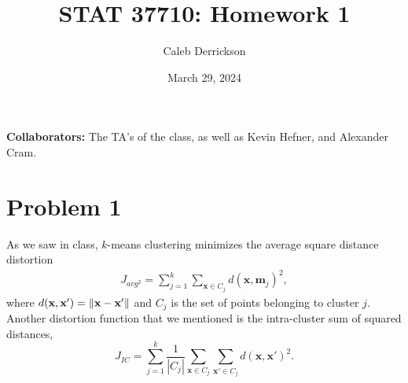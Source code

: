 

\title{STAT 37710: Homework 1}
\author{Caleb Derrickson}
\date{March 29, 2024}


\onehalfspacing
\maketitle
\allowdisplaybreaks
{\color{cit}\vspace{2mm}\noindent\textbf{Collaborators:}} The TA's of the class, as well as Kevin Hefner, and Alexander Cram.

\tableofcontents

\newpage
\section{Problem 1}
As we saw in class, $k$-means clustering minimizes the average square distance distortion
\begin{align}
    J_{avg^2} = \sum_{j = 1}^k\sum_{\textbf{x} \in C_j} d(\textbf{x}, \textbf{m}_j)^2, \label{Javg}
\end{align}
where $d(\textbf{x}, \textbf{x}') = \norm{\textbf{x} - \textbf{x}'}$ and $C_j$ is the set of points belonging to cluster $j$. Another distortion function that we mentioned is the intra-cluster sum of squared distances,
\[J_{IC} = \sum_{j = 1}^k \frac{1}{|C_j|}\sum_{\textbf{x} \in C_j} \sum_{\textbf{x}' \in C_j} d(\textbf{x}, \textbf{x}')^2.\]

\partbreak
